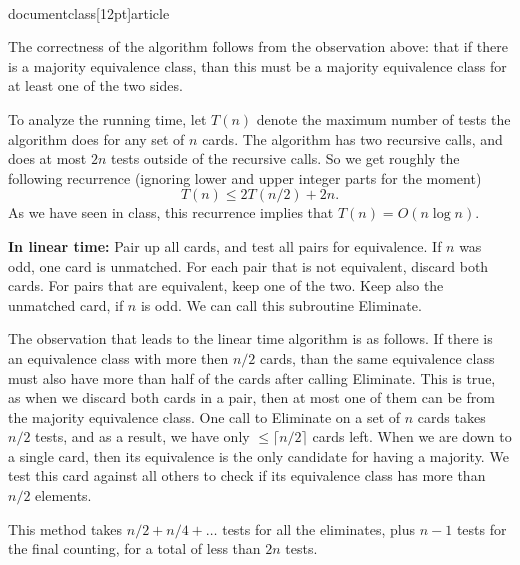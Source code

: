 \\documentclass[12pt]{article}
\newcommand{\Xomit}[1]{}
\newcommand{\proof}[1]{
{\noindent {\it Proof.} {#1} \rule{2mm}{2mm} \vskip \belowdisplayskip}
}
\begin{document}
\begin{enumerate}
{The correctness of the algorithm follows from the observation 
above: that if there is a majority equivalence class, than this
must be a majority equivalence class for at least one of the two
sides. 

To analyze the running time, let $T(n)$ denote the maximum number of
tests the algorithm does for any set of $n$ cards. The algorithm
has two recursive calls, and does at most $2n$ tests outside of the 
recursive calls. So we get roughly the following recurrence
(ignoring lower and
upper integer parts for the moment)
\[T(n) \le 2 T(n/2) +2n.\]
As we have seen in class, this recurrence implies
that $T(n) = O(n \log n)$.

\Xomit{
\begin{itemize}
{\em $T(n) \le 2 n\lceil \log_2 n\rceil$.}
The solution of such a recurrence is $O(n\log n)$ as it is shown below.
\end{itemize}
\proof{We prove this statement by induction on the size $n$ of
$S$. When $n=2$ we do one test, so the statement is true.

Let $k=\lceil \log_2 n\rceil$. We need to prove that the number of 
tests is at most $2nk$. Assume that $S_i$ has size $n_i$. 
Note that $\lceil \log_2 n_i\rceil \le k-1$ for both $i=1,2$. 
By the induction hypothesis the two recursive calls do at 
most $n_i (k-1)$ tests each, and the total number of tests is
at most 
\[2n_1(k-1)+ 2n_2(k-1) +2n =le 2nk.\]
}
}

\vskip 0.2in
\noindent
{\bf  In linear time:}
Pair up all cards, and test all pairs for equivalence. If $n$
was odd, one card is unmatched. For each pair that is not 
equivalent, discard both cards. For pairs that are equivalent, keep one of the
two. Keep also the unmatched card, if $n$ is odd. We can call this 
subroutine {\sc Eliminate}.

The observation that leads to the linear time algorithm is as follows. If there 
is an equivalence class with more then $n/2$ cards, than the same 
equivalence class must also have more than half of the cards after 
calling {\sc Eliminate}. This is true, as when we discard both cards in 
a pair, then at most one of them can be from the majority equivalence class. 
One call to {\sc Eliminate} on a set of $n$ cards takes $n/2$ tests, and
as a result, we have only $\le \lceil n/2 \rceil$ cards left. When we are down 
to a single card, then its equivalence is the only candidate for having a
majority. We test this card against all others to check if its equivalence
class has more than $n/2$ elements.

This method takes $n/2+n/4+\ldots$ tests for all the eliminates, plus $n-1$
tests for the final counting, for a total of less than $2n$ tests.


}

\end{enumerate}
\end{document}
